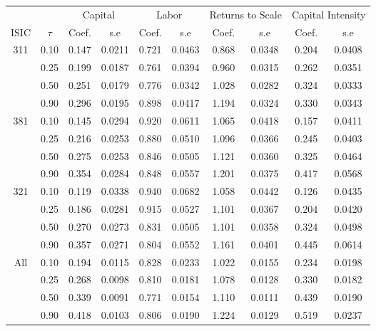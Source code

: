 \begin{table}[H]
\centering
\begin{tabular}{cccccccccc}
  \hline\hline & & \multicolumn{2}{c}{Capital}  & \multicolumn{2}{c}{Labor} & \multicolumn{2}{c}{Returns to Scale} & \multicolumn{2}{c}{Capital Intensity}\\ \cmidrule(lr){3-4} \cmidrule(lr){5-6} \cmidrule(lr){7-8} \cmidrule(lr){9-10}ISIC & $\tau$ & Coef. & s.e & Coef. & s.e & Coef. & s.e & Coef. & s.e \\ 
  \hline
311 & 0.10 & 0.147 & 0.0211 & 0.721 & 0.0463 & 0.868 & 0.0348 & 0.204 & 0.0408 \\ 
   & 0.25 & 0.199 & 0.0187 & 0.761 & 0.0394 & 0.960 & 0.0315 & 0.262 & 0.0351 \\ 
   & 0.50 & 0.251 & 0.0179 & 0.776 & 0.0342 & 1.028 & 0.0282 & 0.324 & 0.0333 \\ 
   & 0.90 & 0.296 & 0.0195 & 0.898 & 0.0417 & 1.194 & 0.0324 & 0.330 & 0.0343 \\ 
  381 & 0.10 & 0.145 & 0.0294 & 0.920 & 0.0611 & 1.065 & 0.0418 & 0.157 & 0.0411 \\ 
   & 0.25 & 0.216 & 0.0253 & 0.880 & 0.0510 & 1.096 & 0.0366 & 0.245 & 0.0403 \\ 
   & 0.50 & 0.275 & 0.0253 & 0.846 & 0.0505 & 1.121 & 0.0360 & 0.325 & 0.0464 \\ 
   & 0.90 & 0.354 & 0.0284 & 0.848 & 0.0557 & 1.201 & 0.0375 & 0.417 & 0.0568 \\ 
  321 & 0.10 & 0.119 & 0.0338 & 0.940 & 0.0682 & 1.058 & 0.0442 & 0.126 & 0.0435 \\ 
   & 0.25 & 0.186 & 0.0281 & 0.915 & 0.0527 & 1.101 & 0.0367 & 0.204 & 0.0420 \\ 
   & 0.50 & 0.270 & 0.0273 & 0.831 & 0.0505 & 1.101 & 0.0358 & 0.324 & 0.0498 \\ 
   & 0.90 & 0.357 & 0.0271 & 0.804 & 0.0552 & 1.161 & 0.0401 & 0.445 & 0.0614 \\ 
  All & 0.10 & 0.194 & 0.0115 & 0.828 & 0.0233 & 1.022 & 0.0155 & 0.234 & 0.0198 \\ 
   & 0.25 & 0.268 & 0.0098 & 0.810 & 0.0181 & 1.078 & 0.0128 & 0.330 & 0.0182 \\ 
   & 0.50 & 0.339 & 0.0091 & 0.771 & 0.0154 & 1.110 & 0.0111 & 0.439 & 0.0190 \\ 
   & 0.90 & 0.418 & 0.0103 & 0.806 & 0.0190 & 1.224 & 0.0129 & 0.519 & 0.0237 \\ 
   \hline
\end{tabular}
\end{table}
